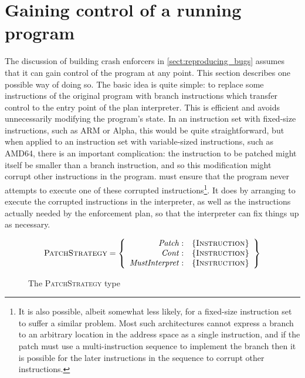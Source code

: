 \chapter{Gaining control of a running program}
\label{sect:enforce:gain_control}


The discussion of building crash enforcers in
\autoref{sect:reproducing_bugs} assumes that it can gain control of
the program at any point.  This section describes one possible way of
doing so.  The basic idea is quite simple: to replace some
instructions of the original program with branch instructions which
transfer control to the entry point of the plan interpreter.  This is
efficient and avoids unnecessarily modifying the program's state.  In
an instruction set with fixed-size instructions, such as
ARM\needCite{} or Alpha\needCite{}, this would be quite
straightforward, but when applied to an instruction set with
variable-sized instructions, such as AMD64, there is an important
complication: the instruction to be patched might itself be smaller
than a branch instruction, and so this modification might corrupt
other instructions in the program.  {\Implementation} must ensure that
the program never attempts to execute one of these corrupted
instructions\footnote{It is also possible, albeit somewhat less
  likely, for a fixed-size instruction set to suffer a similar
  problem.  Most such architectures cannot express a branch to an
  arbitrary location in the address space as a single instruction, and
  if the patch must use a multi-instruction sequence to implement the
  branch then it is possible for the later instructions in the
  sequence to corrupt other instructions.}.  It does by arranging to
execute the corrupted instructions in the interpreter, as well as the
instructions actually needed by the enforcement plan, so that the
interpreter can fix things up as necessary.

\begin{figure}[tp]
  \begin{displaymath}
    \textsc{PatchStrategy} = \left\{\begin{array}{rl}
    \mathit{Patch}: & \{\textsc{Instruction}\} \\
    \mathit{Cont}: & \{\textsc{Instruction}\} \\
    \mathit{MustInterpret}: & \{\textsc{Instruction}\}
    \end{array}\right\}
  \end{displaymath}
  \caption{The \textsc{PatchStrategy} type}
  \label{fig:patch_strategy_type}
\end{figure}

